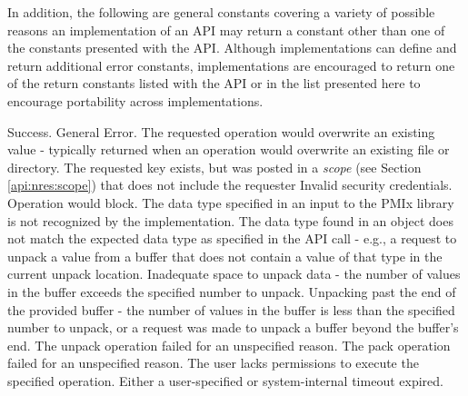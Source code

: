 In addition, the following are general constants covering a variety of possible reasons an implementation of an \ac{API} may return a constant other than one of the constants presented with the \ac{API}.  Although implementations can define and return additional error constants, implementations are encouraged to return one of the return constants listed with the \ac{API} or in the list presented here to encourage portability across implementations. 

\begin{constantdesc}
%
Success.
%
General Error.
%
The requested operation would overwrite an existing value - typically returned
when an operation would overwrite an existing file or directory.
%
The requested key exists, but was posted in a \emph{scope} (see Section \ref{api:nres:scope}) that does not include the requester
%
Invalid security credentials.
%
Operation would block.
%
The data type specified in an input to the \ac{PMIx} library is not recognized
by the implementation.
%
The data type found in an object does not match the expected data type
as specified in the \ac{API} call - e.g., a request to unpack a
 value from a buffer that does not contain a value of
that type in the current unpack location.
%
Inadequate space to unpack data - the number of values in the buffer exceeds
the specified number to unpack.
%
Unpacking past the end of the provided buffer - the number of values in the
buffer is less than the specified number to unpack, or a request was made to
unpack a buffer beyond the buffer's end.
%
The unpack operation failed for an unspecified reason.
%
The pack operation failed for an unspecified reason.
%
The user lacks permissions to execute the specified operation.
%
Either a user-specified or system-internal timeout expired.
%

\end{constantdesc}
